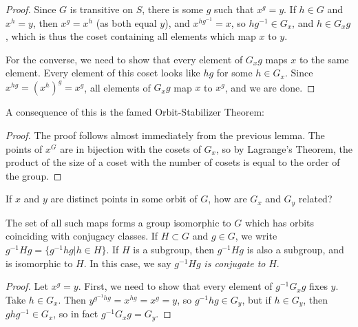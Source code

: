 \begin{proof}
	
	
	Since $G$ is transitive on $S$, there is some $g$ such that $x^g=y$.  If $h\in G$ and $x^h=y$, then $x^g=x^h$ (as both equal $y$), and $x^{hg^{-1}} =x$, so $hg^{-1}\in G_x$, and $h\in G_xg$, which is thus the coset containing all elements which map $x$ to $y$.
	
	For the converse, we need to show that every element of $G_xg$ maps $x$ to the same element.  Every element of this coset looks like $hg$ for some $h\in G_x$.  Since $x^{hg}=(x^h)^g=x^g$, all elements of $G_xg$ map $x$ to $x^g$, and we are done.
	
	
	
	
\end{proof}

A consequence of this is the famed Orbit-Stabilizer Theorem:

\begin{proof}
	The proof follows almost immediately from the previous lemma.  The points of $x^G$ are in bijection with the cosets of $G_x$, so by Lagrange's Theorem, the product of the size of a coset with the number of cosets is equal to the order of the group.
\end{proof}


If $x$ and $y$ are distinct points in some orbit of $G$, how are $G_x$ and $G_y$ related?


The set of all such maps forms a group isomorphic to $G$ which has orbits coinciding with conjugacy classes.  If $H\subset G$ and $g\in G$, we write $g^{-1}Hg = \{g^{-1}hg|h\in H\}$.  If $H$ is a subgroup, then $g^{-1}Hg$ is also a subgroup, and is isomorphic to $H$.  In this case, we say $g^{-1}Hg$ \textit{is conjugate to} $H$.


\begin{proof}
	
	Let $x^g=y$.  First, we need to show that every element of $g^{-1}G_xg$ fixes $y$.  Take $h\in G_x$.  Then $y^{g^{-1}hg}=x^{hg}=x^g=y$, so $g^{-1}hg\in G_y$, but if $h\in G_y$, then $ghg^{-1}\in G_x$, so in fact $g^{-1}G_xg=G_y$.
	
	
	
\end{proof}


